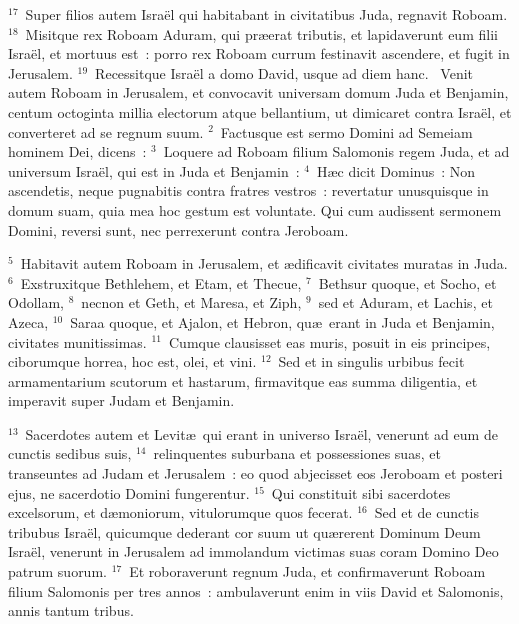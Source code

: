 ${}^{17}$~Super filios autem Isra\"el qui habitabant in civitatibus Juda, regnavit Roboam.
${}^{18}$~Misitque rex Roboam Aduram, qui pr\ae erat tributis, et lapidaverunt eum filii Isra\"el, et mortuus est~: porro rex Roboam currum festinavit ascendere, et fugit in Jerusalem.
${}^{19}$~Recessitque Isra\"el a domo David, usque ad diem hanc.
~Venit autem Roboam in Jerusalem, et convocavit universam domum Juda et Benjamin, centum octoginta millia electorum atque bellantium, ut dimicaret contra Isra\"el, et converteret ad se regnum suum.
${}^{2}$~Factusque est sermo Domini ad Semeiam hominem Dei, dicens~:
${}^{3}$~Loquere ad Roboam filium Salomonis regem Juda, et ad universum Isra\"el, qui est in Juda et Benjamin~:
${}^{4}$~H\ae c dicit Dominus~: Non ascendetis, neque pugnabitis contra fratres vestros~: revertatur unusquisque in domum suam, quia mea hoc gestum est voluntate. Qui cum audissent sermonem Domini, reversi sunt, nec perrexerunt contra Jeroboam.


${}^{5}$~Habitavit autem Roboam in Jerusalem, et \ae dificavit civitates muratas in Juda.
${}^{6}$~Exstruxitque Bethlehem, et Etam, et Thecue,
${}^{7}$~Bethsur quoque, et Socho, et Odollam,
${}^{8}$~necnon et Geth, et Maresa, et Ziph,
${}^{9}$~sed et Aduram, et Lachis, et Azeca,
${}^{10}$~Saraa quoque, et Ajalon, et Hebron, qu\ae\ erant in Juda et Benjamin, civitates munitissimas.
${}^{11}$~Cumque clausisset eas muris, posuit in eis principes, ciborumque horrea, hoc est, olei, et vini.
${}^{12}$~Sed et in singulis urbibus fecit armamentarium scutorum et hastarum, firmavitque eas summa diligentia, et imperavit super Judam et Benjamin.


${}^{13}$~Sacerdotes autem et Levit\ae\ qui erant in universo Isra\"el, venerunt ad eum de cunctis sedibus suis,
${}^{14}$~relinquentes suburbana et possessiones suas, et transeuntes ad Judam et Jerusalem~: eo quod abjecisset eos Jeroboam et posteri ejus, ne sacerdotio Domini fungerentur.
${}^{15}$~Qui constituit sibi sacerdotes excelsorum, et d\ae moniorum, vitulorumque quos fecerat.
${}^{16}$~Sed et de cunctis tribubus Isra\"el, quicumque dederant cor suum ut qu\ae rerent Dominum Deum Isra\"el, venerunt in Jerusalem ad immolandum victimas suas coram Domino Deo patrum suorum.
${}^{17}$~Et roboraverunt regnum Juda, et confirmaverunt Roboam filium Salomonis per tres annos~: ambulaverunt enim in viis David et Salomonis, annis tantum tribus.


